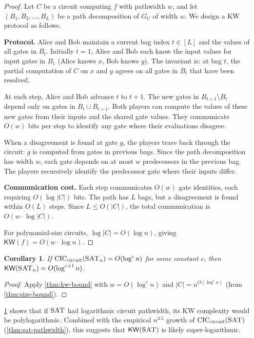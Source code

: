 \documentclass[11pt]{article}
\theoremstyle{plain}
\newtheorem{corollary}[theorem]{Corollary}
\theoremstyle{definition}
\newcommand{\CIC}{\operatorname{CIC}}
\newcommand{\CICcirc}{\CIC_{\text{circuit}}}
\newcommand{\SAT}{\textsc{SAT}}
\newcommand{\KW}{\mathsf{KW}}
\begin{document}
\begin{proof}
Let $C$ be a circuit computing $f$ with pathwidth $w$, and let $(B_1, B_2, \ldots, B_L)$ be a path decomposition of $G_C$ of width $w$. We design a KW protocol as follows.

\textbf{Protocol.} Alice and Bob maintain a current bag index $t \in [L]$ and the values of all gates in $B_t$. Initially $t = 1$; Alice and Bob each know the input values for input gates in $B_1$ (Alice knows $x$, Bob knows $y$). The invariant is: at bag $t$, the partial computation of $C$ on $x$ and $y$ agrees on all gates in $B_t$ that have been resolved.

At each step, Alice and Bob advance $t$ to $t+1$. The new gates in $B_{t+1} \setminus B_t$ depend only on gates in $B_t \cup B_{t+1}$. Both players can compute the values of these new gates from their inputs and the shared gate values. They communicate $O(w)$ bits per step to identify any gate where their evaluations disagree.

When a disagreement is found at gate $g$, the players trace back through the circuit: $g$ is computed from gates in previous bags. Since the path decomposition has width $w$, each gate depends on at most $w$ predecessors in the previous bag. The players recursively identify the predecessor gate where their inputs differ.

\textbf{Communication cost.} Each step communicates $O(w)$ gate identities, each requiring $O(\log |C|)$ bits. The path has $L$ bags, but a disagreement is found within $O(L)$ steps. Since $L \leq O(|C|)$, the total communication is $O(w \cdot \log |C|)$.

For polynomial-size circuits, $\log |C| = O(\log n)$, giving $\KW(f) = O(w \cdot \log n)$.
\end{proof}

\begin{corollary}\label{cor:kw-sat}
If $\CICcirc(\SAT_n) = O(\log^c n)$ for some constant $c$, then $\KW(\SAT_n) = O(\log^{c+1} n)$.
\end{corollary}

\begin{proof}
Apply \cref{thm:kw-bound} with $w = O(\log^c n)$ and $|C| = n^{O(\log^c n)}$ (from \cref{thm:size-bound}).
\end{proof}

\cref{cor:kw-sat} shows that if $\SAT$ had logarithmic circuit pathwidth, its KW complexity would be polylogarithmic. Combined with the empirical $n^{3.5}$ growth of $\CICcirc(\SAT)$ (\cref{thm:sat-pathwidth}), this suggests that $\KW(\SAT)$ is likely super-logarithmic.
\end{document}

